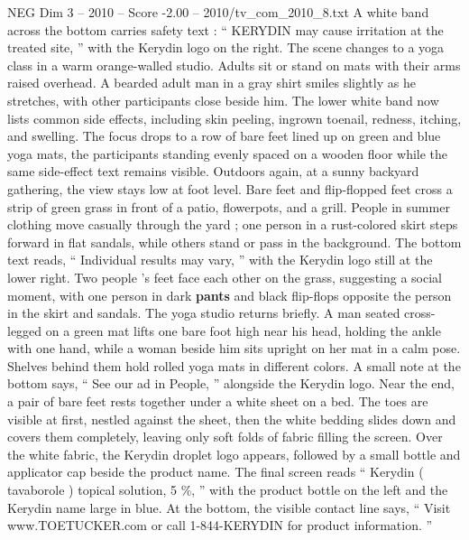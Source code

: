 \begin{textsample}{NEG Dim 3 – 2010 – Score -2.00 – 2010/tv\_com\_2010\_8.txt}
A white band across the bottom carries safety text : “ KERYDIN may cause irritation at the treated site, ” with the Kerydin logo on the right.
The scene changes to a yoga class in a warm orange-walled studio.
Adults sit or stand on mats with their arms raised overhead.
A bearded adult man in a gray shirt smiles slightly as he stretches, with other participants close beside him.
The lower white band now lists common side effects, including skin peeling, ingrown toenail, redness, itching, and swelling.
The focus drops to a row of bare feet lined up on green and blue yoga mats, the participants standing evenly spaced on a wooden floor while the same side-effect text remains visible.
Outdoors again, at a sunny backyard gathering, the view stays low at foot level.
Bare feet and flip-flopped feet cross a strip of green grass in front of a patio, flowerpots, and a grill.
People in summer clothing move casually through the yard ; one person in a rust-colored skirt steps forward in flat sandals, while others stand or pass in the background.
The bottom text reads, “ Individual results may vary, ” with the Kerydin logo still at the lower right.
Two people ’s feet face each other on the grass, suggesting a social moment, with one person in dark \textbf{pants} and black flip-flops opposite the person in the skirt and sandals.
The yoga studio returns briefly.
A man seated cross-legged on a green mat lifts one bare foot high near his head, holding the ankle with one hand, while a woman beside him sits upright on her mat in a calm pose.
Shelves behind them hold rolled yoga mats in different colors.
A small note at the bottom says, “ See our ad in People, ” alongside the Kerydin logo.
Near the end, a pair of bare feet rests together under a white sheet on a bed.
The toes are visible at first, nestled against the sheet, then the white bedding slides down and covers them completely, leaving only soft folds of fabric filling the screen.
Over the white fabric, the Kerydin droplet logo appears, followed by a small bottle and applicator cap beside the product name.
The final screen reads “ Kerydin ( tavaborole ) topical solution, 5 \%, ” with the product bottle on the left and the Kerydin name large in blue.
At the bottom, the visible contact line says, “ Visit www.TOETUCKER.com or call 1-844-KERYDIN for product information. ”

\end{textsample}
